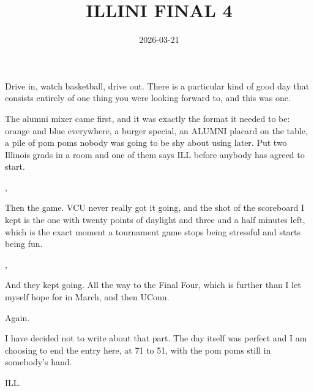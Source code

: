 
\title{ILLINI FINAL 4}
\date{2026-03-21}




Drive in, watch basketball, drive out. There is a particular kind of good day that
consists entirely of one thing you were looking forward to, and this was one.


The alumni mixer came first, and it was exactly the format it needed to be:
orange and blue everywhere, a burger special, an ALUMNI placard on the table, a
pile of pom poms nobody was going to be shy about using later. Put two Illinois
grads in a room and one of them says ILL before anybody has agreed to start.


\sep

Then the game. VCU never really got it going, and the shot of the scoreboard I
kept is the one with twenty points of daylight and three and a half minutes
left, which is the exact moment a tournament game stops being stressful and
starts being fun.



\sep

And they kept going. All the way to the Final Four, which is further than I let
myself hope for in March, and then UConn.

Again.

I have decided not to write about that part. The day itself was perfect and I
am choosing to end the entry here, at 71 to 51, with the pom poms still in
somebody's hand.

ILL.


